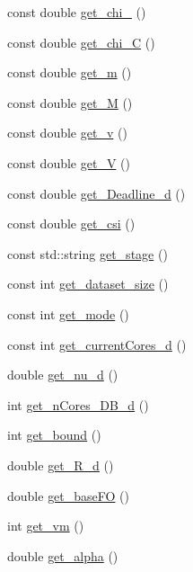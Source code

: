 \begin{DoxyCompactItemize}
const double \hyperlink{classApplication_a481b3736e133c2a183d3a43f79a44ccf}{get\-\_\-chi\-\_} ()
\item 
const double \hyperlink{classApplication_af1f1a5094b8afa7f9259c15f463b3e72}{get\-\_\-chi\-\_\-\-C} ()
\item 
const double \hyperlink{classApplication_a4e0cd1b869a5a201f3c7d7f2a7313e86}{get\-\_\-m} ()
\item 
const double \hyperlink{classApplication_a7d136a2b9e7759cd7780e85bccfb06d9}{get\-\_\-\-M} ()
\item 
const double \hyperlink{classApplication_a9eed06220d6f5a521c8ff4b4417cd56f}{get\-\_\-v} ()
\item 
const double \hyperlink{classApplication_ac6ee3f52f5049f95109384cdc2990bef}{get\-\_\-\-V} ()
\item 
const double \hyperlink{classApplication_a5fccaf9e0138089067d19f31e0891234}{get\-\_\-\-Deadline\-\_\-d} ()
\item 
const double \hyperlink{classApplication_a6c48b8ebcd884aed4c3153e53e3a4dc1}{get\-\_\-csi} ()
\item 
const std\-::string \hyperlink{classApplication_aa3b7fa5dbc85e1f0518bd1f85fa7205f}{get\-\_\-stage} ()
\item 
const int \hyperlink{classApplication_af8fb87ff4a7f2ba111f2bc6978645f93}{get\-\_\-dataset\-\_\-size} ()
\item 
const int \hyperlink{classApplication_ad7062d15b93f04326f2b9062f36ae1ac}{get\-\_\-mode} ()
\item 
const int \hyperlink{classApplication_a23f9b3373441f6b7449886a2460271ae}{get\-\_\-current\-Cores\-\_\-d} ()
\item 
double \hyperlink{classApplication_aa6b441c3147aec3aa0192d2e9f76251d}{get\-\_\-nu\-\_\-d} ()
\item 
int \hyperlink{classApplication_a97149e55a340940c15d56be4fb577767}{get\-\_\-n\-Cores\-\_\-\-D\-B\-\_\-d} ()
\item 
int \hyperlink{classApplication_afe686f73d03090e8e179704df91a0b2b}{get\-\_\-bound} ()
\item 
double \hyperlink{classApplication_ad0d83c496de2ca9268bb4d3f743dacac}{get\-\_\-\-R\-\_\-d} ()
\item 
double \hyperlink{classApplication_affaab47de2a18e0dc08c7a6bcd272c5a}{get\-\_\-base\-F\-O} ()
\item 
int \hyperlink{classApplication_a5d59e42d6f67c8f519d4c14df49e82a6}{get\-\_\-vm} ()
\item 
double \hyperlink{classApplication_a0bb182c29dbaf5293a120bdced8d08b6}{get\-\_\-alpha} ()

\end{DoxyCompactItemize}
